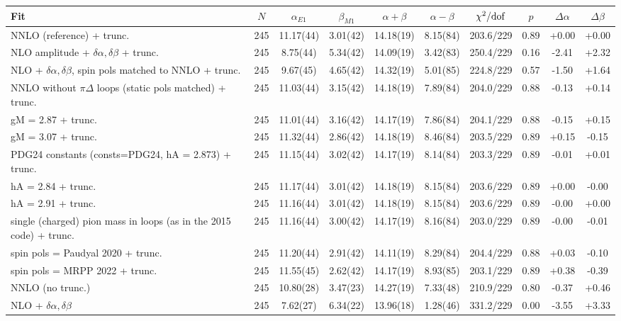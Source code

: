 \begin{tabular}{lccccccccc}
\hline
Fit & $N$ & $\alpha_{E1}$ & $\beta_{M1}$ & $\alpha+\beta$ & $\alpha-\beta$ & $\chi^2/{\rm dof}$ & $p$ & $\Delta\alpha$ & $\Delta\beta$ \\
\hline
NNLO (reference) + trunc. & 245 & 11.17(44) & 3.01(42) & 14.18(19) & 8.15(84) & 203.6/229 & 0.89 & +0.00 & +0.00 \\
NLO amplitude + $\delta\alpha,\delta\beta$ + trunc. & 245 & 8.75(44) & 5.34(42) & 14.09(19) & 3.42(83) & 250.4/229 & 0.16 & -2.41 & +2.32 \\
NLO + $\delta\alpha,\delta\beta$, spin pols matched to NNLO + trunc. & 245 & 9.67(45) & 4.65(42) & 14.32(19) & 5.01(85) & 224.8/229 & 0.57 & -1.50 & +1.64 \\
NNLO without $\pi\Delta$ loops (static pols matched) + trunc. & 245 & 11.03(44) & 3.15(42) & 14.18(19) & 7.89(84) & 204.0/229 & 0.88 & -0.13 & +0.14 \\
gM = 2.87 + trunc. & 245 & 11.01(44) & 3.16(42) & 14.17(19) & 7.86(84) & 204.1/229 & 0.88 & -0.15 & +0.15 \\
gM = 3.07 + trunc. & 245 & 11.32(44) & 2.86(42) & 14.18(19) & 8.46(84) & 203.5/229 & 0.89 & +0.15 & -0.15 \\
PDG24 constants (consts=PDG24, hA = 2.873) + trunc. & 245 & 11.15(44) & 3.02(42) & 14.17(19) & 8.14(84) & 203.3/229 & 0.89 & -0.01 & +0.01 \\
hA = 2.84 + trunc. & 245 & 11.17(44) & 3.01(42) & 14.18(19) & 8.15(84) & 203.6/229 & 0.89 & +0.00 & -0.00 \\
hA = 2.91 + trunc. & 245 & 11.16(44) & 3.01(42) & 14.18(19) & 8.15(84) & 203.6/229 & 0.89 & -0.00 & +0.00 \\
single (charged) pion mass in loops (as in the 2015 code) + trunc. & 245 & 11.16(44) & 3.00(42) & 14.17(19) & 8.16(84) & 203.0/229 & 0.89 & -0.00 & -0.01 \\
spin pols = Paudyal 2020 + trunc. & 245 & 11.20(44) & 2.91(42) & 14.11(19) & 8.29(84) & 204.4/229 & 0.88 & +0.03 & -0.10 \\
spin pols = MRPP 2022 + trunc. & 245 & 11.55(45) & 2.62(42) & 14.17(19) & 8.93(85) & 203.1/229 & 0.89 & +0.38 & -0.39 \\
NNLO (no trunc.) & 245 & 10.80(28) & 3.47(23) & 14.27(19) & 7.33(48) & 210.9/229 & 0.80 & -0.37 & +0.46 \\
NLO + $\delta\alpha,\delta\beta$ & 245 & 7.62(27) & 6.34(22) & 13.96(18) & 1.28(46) & 331.2/229 & 0.00 & -3.55 & +3.33 \\

\end{tabular}
